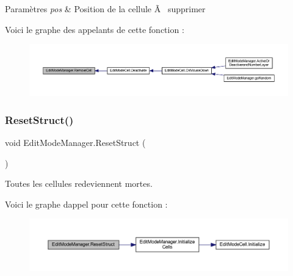 \begin{DoxyParams}{Paramètres}
{\em pos} & Position de la cellule Ã  supprimer\\
\hline
\end{DoxyParams}
Voici le graphe des appelants de cette fonction \+:
\nopagebreak
\begin{figure}[H]
\begin{center}
\leavevmode
\includegraphics[width=350pt]{class_edit_mode_manager_a8a8c1a3a9558fbbcfa7c15d8ce48a264_icgraph}
\end{center}
\end{figure}
\mbox{\label{class_edit_mode_manager_afc8be75da1a5042fcf78b0e9bf1e2108}} 
\subsubsection{\texorpdfstring{Reset\+Struct()}{ResetStruct()}}
{\footnotesize\ttfamily void Edit\+Mode\+Manager.\+Reset\+Struct (\begin{DoxyParamCaption}{ }\end{DoxyParamCaption})\hspace{0.3cm}{\ttfamily [inline]}}



Toutes les cellules redeviennent mortes. 

Voici le graphe d\textquotesingle{}appel pour cette fonction \+:
\nopagebreak
\begin{figure}[H]
\begin{center}
\leavevmode
\includegraphics[width=350pt]{class_edit_mode_manager_afc8be75da1a5042fcf78b0e9bf1e2108_cgraph}
\end{center}
\end{figure}
\mbox{\label{class_edit_mode_manager_acf80baac30f6611bcb1bf97b61ffc1ca}} 
